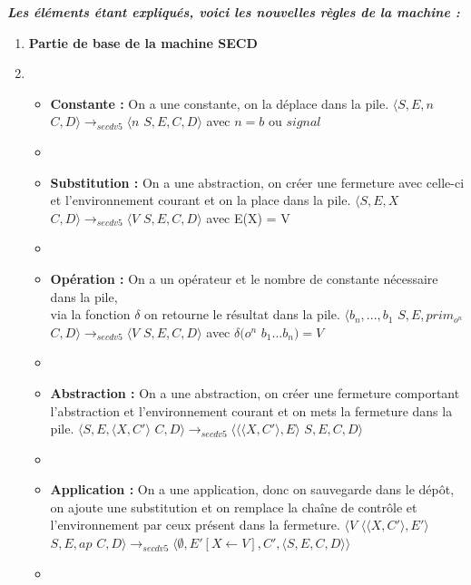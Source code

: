 \documentclass[10pt,a4paper]{article}
\begin{document}
		\textbf{\textit{Les éléments étant expliqués, voici les nouvelles règles de la machine :}}
		\smallbreak
		\begin{enumerate}
			\item[] \textbf{Partie de base de la machine SECD} 
			\item[]
			\begin{itemize}
				\item[] \textbf{Constante :} On a une constante, on la déplace dans la pile.
				\smallbreak
				$\langle S,E,n$ $C,D\rangle 
				\longrightarrow_{secdv5} \langle n$ $S,E,C,D\rangle$ avec $n = b$ ou $signal$
				\item[]
				
				\item[] \textbf{Substitution :} On a une abstraction, on créer une fermeture avec celle-ci et l'environnement courant et on la place dans la pile.
				\smallbreak
				$\langle S,E,X$ $C,D\rangle
				\longrightarrow_{secdv5} \langle V$ $S,E,C,D\rangle$ avec E(X) = V
				\item[]
				
				\item[] \textbf{Opération :} On a un opérateur et le nombre de constante nécessaire dans la pile, \\via la fonction $\delta$ on retourne le résultat dans la pile.
				\smallbreak
				$\langle b_{n},...,b_{1}$ $S,E,prim_{o^{n}}$ $C,D\rangle
				\longrightarrow_{secdv5} \langle V$ $S,E,C,D\rangle$ avec $\delta(o^{n}$ $b_{1}...b_{n}) = V$
				\item[]
				
				\item[]  \textbf{Abstraction :} On a une abstraction, on créer une fermeture comportant l'abstraction et l'environnement courant et on mets la fermeture dans la pile.
				\smallbreak
				$\langle S,E,\langle X,C'\rangle$ $C,D\rangle
				\longrightarrow_{secdv5} \langle \langle\langle X,C'\rangle,E\rangle$ $S,E,C,D\rangle$
				\item[]
				
				\item[]  \textbf{Application :} On a une application, donc on sauvegarde dans le dépôt, on ajoute une substitution et on remplace la chaîne de contrôle et l'environnement par ceux présent dans la fermeture.
				\smallbreak
				$\langle V$ $\langle\langle X,C'\rangle,E'\rangle$ $S,E,ap$ $C,D\rangle
				\longrightarrow_{secdv5} \langle \emptyset,E'[X \leftarrow V],C',\langle S,E,C,D\rangle\rangle$
				\item[] 
				

\end{itemize}
\end{enumerate}
\end{document}

